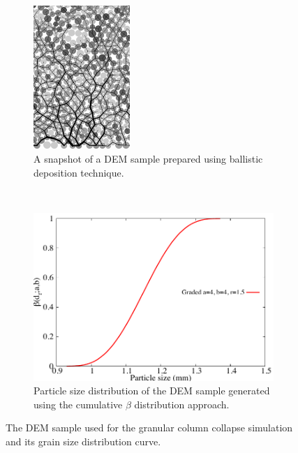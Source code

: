 \begin{figure}[tbhp]
\centering
\begin{subfigure}[b]{0.95\textwidth}
\centering
\includegraphics[width=0.4\textwidth]{a4b4r18}
\caption{A snapshot of a DEM sample prepared using ballistic deposition 
technique.}
\label{fig:a4b4r18}
\end{subfigure}
\\
\begin{subfigure}[b]{0.75\textwidth}
\centering
\includegraphics[width=\textwidth]{PSD}
\caption{Particle size distribution of the DEM sample generated using the 
cumulative $\beta$ distribution approach.}
\label{fig:PSD}
\end{subfigure}
\caption{The DEM sample used for the granular column collapse simulation and 
its grain size distribution curve.}
\label{fig:DEM_Sample}
\end{figure}


